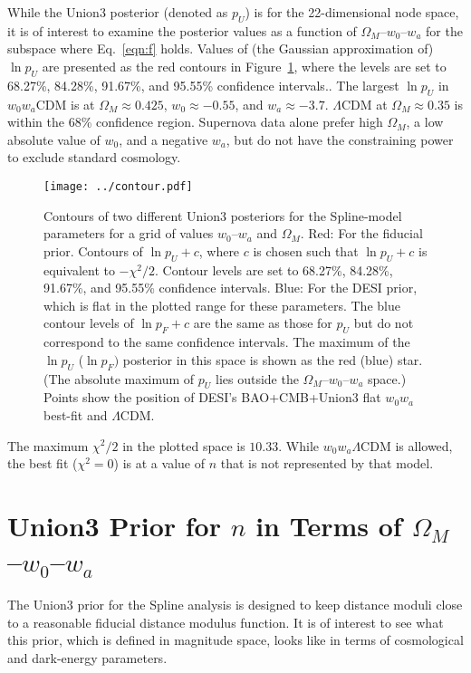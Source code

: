 \documentclass{aastex631}
\begin{document}
While the Union3 posterior (denoted as $p_U$) is for the 22-dimensional node space, it is of interest to examine the posterior values 
as a function of $\Omega_M$--$w_0$--$w_a$ for the
subspace where Eq.~\ref{eqn:f} holds. 
Values of (the Gaussian approximation of) $\ln{p_U}$
 are presented as the red contours in Figure~\ref{fig:posterior}, where the levels are set to 68.27\%, 84.28\%, 91.67\%, and 95.55\% confidence intervals..
The largest $\ln{p_U}$ in $w_0w_a$CDM is at $\Omega_M\approx 0.425$, $w_0 \approx -0.55$, and $w_a \approx -3.7$. $\Lambda$CDM at $\Omega_M \approx 0.35$ is within the 68\% confidence region.
Supernova data alone prefer high $\Omega_M$, a low absolute value of $w_0$, and a negative $w_a$, but do not have
the constraining power to exclude standard cosmology.

\begin{figure}[htbp] %
   \centering
   \texttt{[image: ../contour.pdf]} 
   \caption{Contours of two different Union3 posteriors for the Spline-model parameters for a grid of values
 $w_0$--$w_a$ and $\Omega_M$.   
  Red: For the fiducial prior.  Contours of  $\ln{p_U}+c$, where $c$ is chosen such that $\ln{p_U}+c$  is equivalent to  $-\chi^2/2$. Contour levels are set to 68.27\%, 84.28\%, 91.67\%, and 95.55\% confidence intervals.
   Blue: For the DESI prior, which is flat in the plotted range for these parameters. 
   The blue contour levels of $\ln{p_F}+c$ are the same as those for $p_U$ but do not correspond to the same confidence intervals.
   The maximum of the $\ln{p}_U$  ($\ln{p}_F)$ posterior in this space is shown as the red (blue) star.  (The absolute maximum
   of $p_U$
   lies outside the $\Omega_M$--$w_0$--$w_a$ space.)
   Points show the position of DESI's  BAO+CMB+Union3 flat $w_0w_a$ best-fit 
    and  $\Lambda$CDM.}
   \label{fig:posterior}
\end{figure}

The maximum $\chi^2/2$ in the plotted space is $10.33$.  While $w_0w_a\Lambda$CDM is allowed, the best fit ($\chi^2=0$)
is at a value of $n$ that is not represented by that model. 

\section{Union3 Prior for $n$ in Terms of $\Omega_M$--$w_0$--$w_a$}
\label{sec:prior}
The Union3 prior for the Spline analysis is designed to keep distance moduli close to a reasonable
fiducial distance modulus function.  It is of interest to see what this prior, which is defined in magnitude
space, looks like in terms of cosmological and dark-energy parameters.
\end{document}
